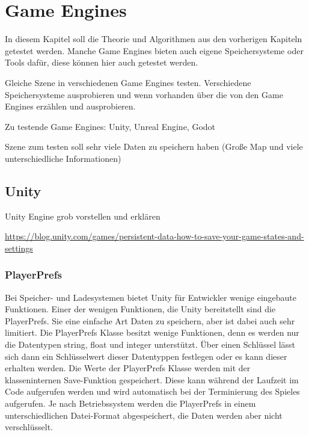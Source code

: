 \chapter{Game Engines}\label{ch:gameengines}
In diesem Kapitel soll die Theorie und Algorithmen aus den vorherigen Kapiteln 
getestet werden. Manche Game Engines bieten auch eigene Speichersysteme oder
Tools dafür, diese können hier auch getestet werden.

Gleiche Szene in verschiedenen Game Engines testen. 
Verschiedene Speichersysteme ausprobieren und wenn vorhanden über die von den Game Engines erzählen und ausprobieren.

Zu testende Game Engines: Unity, Unreal Engine, Godot

Szene zum testen soll sehr viele Daten zu speichern haben (Große Map und viele unterschiedliche Informationen)


\section{Unity}
Unity Engine grob vorstellen und erklären

\url{https://blog.unity.com/games/persistent-data-how-to-save-your-game-states-and-settings}


\subsection{PlayerPrefs}
Bei Speicher- und Ladesystemen bietet Unity für Entwickler wenige eingebaute Funktionen. Einer der wenigen Funktionen, die Unity bereitstellt sind die PlayerPrefs. Sie eine einfache Art Daten zu speichern, aber ist dabei auch sehr limitiert. Die PlayerPrefs Klasse besitzt wenige Funktionen, denn es werden nur die Datentypen string, float und integer unterstützt. Über einen Schlüssel lässt sich dann ein Schlüsselwert dieser Datentyppen festlegen oder es kann dieser erhalten werden. Die Werte der PlayerPrefs Klasse werden mit der klasseninternen Save-Funktion gespeichert. Diese kann während der Laufzeit im Code aufgerufen werden und wird automatisch bei der Terminierung des Spieles aufgerufen.\cite{unityPlayerPrefsSave} Je nach Betriebssystem werden die PlayerPrefs in einem unterschiedlichen Datei-Format abgespeichert, die Daten werden aber nicht verschlüsselt.
\cite{unityPlayerPrefs}

